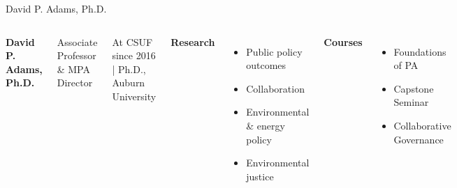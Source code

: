 \documentclass[10pt]{beamer}
\newlength{\imageheight}
\begin{document}
\begin{frame}{David P. Adams, Ph.D.}
\begin{columns}[T,onlytextwidth]
    \raggedright
    {\large\bfseries David P. Adams, Ph.D.}\par
    {Associate Professor \& MPA Director}\par
    {\footnotesize At CSUF since 2016 \quad | \quad Ph.D., Auburn University}\par\vspace{0.4em}

    \textbf{Research}
    \begin{itemize}
      \item Public policy outcomes
      \item Collaboration
      \item Environmental \& energy policy
      \item Environmental justice
    \end{itemize}

    \textbf{Courses}
    \begin{itemize}
      \item Foundations of PA
      \item Capstone Seminar
      \item Collaborative Governance
    \end{itemize}

    \vspace*{0.25cm}
    \includegraphics[height=\imageheight]{images/adams.jpg}
\end{columns}
\end{frame}
\end{document}
